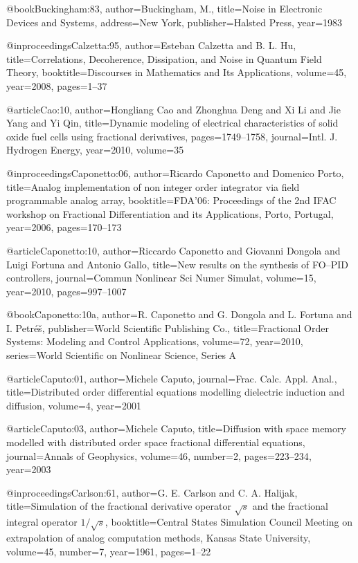 \begin{thebibliography}{99}
@book{Buckingham:83,
  author={Buckingham, M.},
  title={Noise in Electronic Devices and Systems},
  address={New York},
  publisher={Halsted Press},
  year={1983}
}

@inproceedings{Calzetta:95,
  author={Esteban Calzetta and B. L. Hu},
  title={Correlations, Decoherence, Dissipation, and Noise in {Q}uantum {F}ield
    {T}heory},
  booktitle={Discourses in Mathematics and Its Applications},
  volume={45},
  year={2008},
  pages={1--37}
}

@article{Cao:10,
  author={Hongliang Cao and Zhonghua Deng and Xi Li and Jie Yang and Yi Qin},
  title={Dynamic modeling of electrical characteristics of solid oxide fuel cells
    using fractional derivatives},
  pages={1749--1758},
  journal={Intl. J. Hydrogen Energy},
  year={2010},
  volume={35}
}

@inproceedings{Caponetto:06,
  author={Ricardo Caponetto and Domenico Porto},
  title={Analog implementation of non integer order integrator via field programmable
    analog array},
  booktitle={FDA'06: Proceedings of the 2nd IFAC workshop on Fractional Differentiation
    and its Applications, Porto, Portugal},
  year={2006},
  pages={170--173}
}

@article{Caponetto:10,
  author={Riccardo Caponetto and Giovanni Dongola and Luigi Fortuna and Antonio
    Gallo},
  title={New results on the synthesis of {FO--PID} controllers},
  journal={Commun Nonlinear Sci Numer Simulat},
  volume={15},
  year={2010},
  pages={997--1007}
}

@book{Caponetto:10a,
  author={R. Caponetto and G. Dongola and L. Fortuna and I. Petr\'{e}\v{s}},
  publisher={World Scientific Publishing Co.},
  title={Fractional Order Systems: Modeling and Control Applications},
  volume={72},
  year={2010},
  series={World Scientific on Nonlinear Science, Series A}
}

@article{Caputo:01,
  author={Michele Caputo},
  journal={Frac. Calc. Appl. Anal.},
  title={Distributed order differential equations modelling dielectric induction
    and diffusion},
  volume={4},
  year={2001}
}

@article{Caputo:03,
  author={Michele Caputo},
  title={Diffusion with space memory modelled with distributed order space fractional
    differential equations},
  journal={Annals of Geophysics},
  volume={46},
  number={2},
  pages={223--234},
  year={2003}
}

@inproceedings{Carlson:61,
  author={G. E. Carlson and C. A. Halijak},
  title={Simulation of the fractional derivative operator $\sqrt{s}$ and the fractional
    integral operator $1/\sqrt{s}$},
  booktitle={Central States Simulation Council Meeting on extrapolation of analog
    computation methods, Kansas State University},
  volume={45},
  number={7},
  year={1961},
  pages={1--22}
}


\end{thebibliography}
